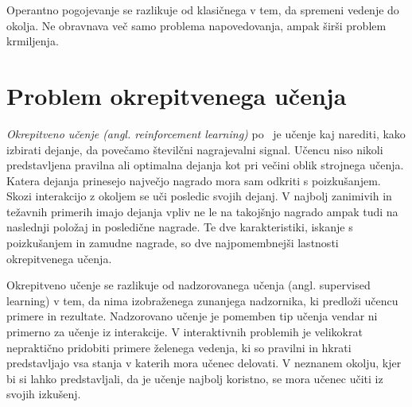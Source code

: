 \documentclass[a4paper, oneside, 12pt]{report}
\begin{document}
Operantno pogojevanje se razlikuje od klasičnega v tem, da spremeni vedenje do okolja. Ne obravnava več samo problema napovedovanja, ampak širši problem krmiljenja.

\chapter{Problem okrepitvenega učenja} \label{chapter:Problem}
\thispagestyle{fancy}
{\em Okrepitveno učenje (angl. reinforcement learning)} po~\cite{ReinforcementLearningAnIntroduction} je učenje kaj narediti, kako izbirati dejanje, da povečamo številčni nagrajevalni signal. Učencu niso nikoli predstavljena pravilna ali optimalna dejanja kot pri večini oblik strojnega učenja. Katera dejanja prinesejo največjo nagrado mora sam odkriti s poizkušanjem. Skozi interakcijo z okoljem se uči posledic svojih dejanj. V najbolj zanimivih in težavnih primerih imajo dejanja vpliv ne le na takojšnjo nagrado ampak tudi na naslednji položaj in posledične nagrade. Te dve karakteristiki, iskanje s poizkušanjem in zamudne nagrade, so dve najpomembnejši lastnosti okrepitvenega učenja.


Okrepitveno učenje se razlikuje od nadzorovanega učenja (angl. supervised learning) v tem, da nima izobraženega zunanjega nadzornika, ki predloži učencu primere in rezultate. Nadzorovano učenje je pomemben tip učenja vendar ni primerno za učenje iz interakcije. V interaktivnih problemih je velikokrat nepraktično pridobiti primere želenega vedenja, ki so pravilni in hkrati predstavljajo vsa stanja v katerih mora učenec delovati. V neznanem okolju, kjer bi si lahko predstavljali, da je učenje najbolj koristno, se mora učenec učiti iz svojih izkušenj.
\end{document}
